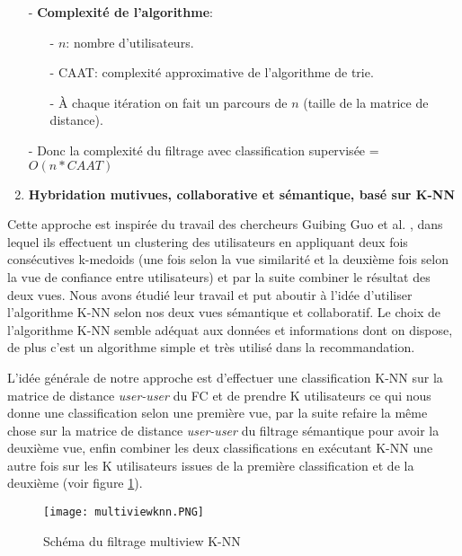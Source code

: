 \begin{itemize}
	\item [-] \textbf{Complexité de l'algorithme}:
	\begin{itemize}
		\item [-] $n$: nombre d'utilisateurs.
		\item [-] CAAT: complexité approximative de l'algorithme de trie.
		\item [-] À chaque itération on fait un parcours de $n$ (taille de la matrice de distance).
	\end{itemize}
	\item [-]  Donc la complexité du filtrage avec classification supervisée = $O(n*CAAT)$
\end{itemize}
	
\mbox{}
\begin{enumerate}[nosep,label=\textbf{\arabic*)}]
	  \setcounter{enumi}{1}
	\item \textbf{Hybridation mutivues, collaborative et sémantique, basé sur K-NN}
\end{enumerate}\mbox{}\indent Cette approche est inspirée du travail des chercheurs Guibing Guo et al. \cite{ref30}, dans lequel ils effectuent un clustering des utilisateurs en appliquant deux fois consécutives k-medoids (une fois selon la vue similarité et la deuxième fois selon la vue de confiance entre utilisateurs) et par la suite combiner le résultat des deux vues.
Nous avons étudié leur travail et put aboutir à l'idée d'utiliser l'algorithme K-NN selon nos deux vues sémantique et collaboratif.
Le choix de l'algorithme K-NN semble adéquat aux données et informations dont on dispose, de plus c'est un algorithme simple et très utilisé dans la recommandation.

L'idée générale de notre approche est d'effectuer une classification K-NN sur la matrice de distance \textit{user-user} du FC et de prendre K utilisateurs ce qui nous donne une classification selon une première vue, par la suite refaire la même chose sur la matrice de distance \textit{user-user} du filtrage sémantique  pour avoir la deuxième vue, enfin combiner les deux classifications en exécutant K-NN une autre fois sur les K utilisateurs issues de la première classification et de la deuxième (voir figure \ref{fig:knn}).


\begin{figure}[H]
	\centering
	\texttt{[image: multiviewknn.PNG]}
	\caption{Schéma du filtrage multiview K-NN}
	\label{fig:knn}
\end{figure} 

